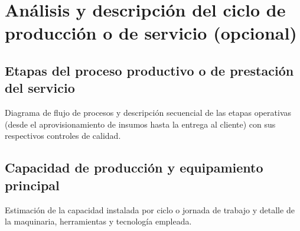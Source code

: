 \section{Análisis y descripción del ciclo de producción o de servicio (opcional)}
\label{sec:ciclo_produccion}

\subsection{Etapas del proceso productivo o de prestación del servicio}
Diagrama de flujo de procesos y descripción secuencial de las etapas operativas (desde el aprovisionamiento de insumos hasta la entrega al cliente) con sus respectivos controles de calidad.

\subsection{Capacidad de producción y equipamiento principal}
Estimación de la capacidad instalada por ciclo o jornada de trabajo y detalle de la maquinaria, herramientas y tecnología empleada.

